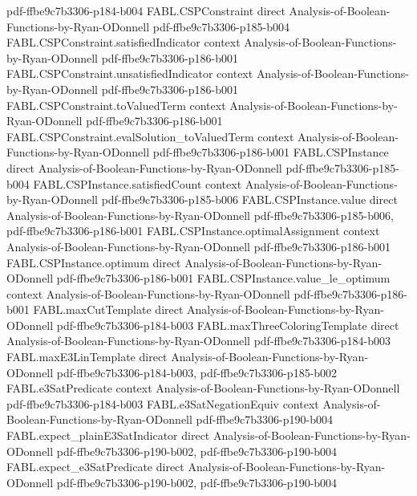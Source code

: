 \begin{theorem}
  {pdf-ffbe9c7b3306-p184-b004}
\proofstep
  {FABL.CSPConstraint}
  {direct}
  {Analysis-of-Boolean-Functions-by-Ryan-ODonnell}
  {pdf-ffbe9c7b3306-p185-b004}
\proofstep
  {FABL.CSPConstraint.satisfiedIndicator}
  {context}
  {Analysis-of-Boolean-Functions-by-Ryan-ODonnell}
  {pdf-ffbe9c7b3306-p186-b001}
\proofstep
  {FABL.CSPConstraint.unsatisfiedIndicator}
  {context}
  {Analysis-of-Boolean-Functions-by-Ryan-ODonnell}
  {pdf-ffbe9c7b3306-p186-b001}
\proofstep
  {FABL.CSPConstraint.toValuedTerm}
  {context}
  {Analysis-of-Boolean-Functions-by-Ryan-ODonnell}
  {pdf-ffbe9c7b3306-p186-b001}
\proofstep
  {FABL.CSPConstraint.evalSolution_toValuedTerm}
  {context}
  {Analysis-of-Boolean-Functions-by-Ryan-ODonnell}
  {pdf-ffbe9c7b3306-p186-b001}
\proofstep
  {FABL.CSPInstance}
  {direct}
  {Analysis-of-Boolean-Functions-by-Ryan-ODonnell}
  {pdf-ffbe9c7b3306-p185-b004}
\proofstep
  {FABL.CSPInstance.satisfiedCount}
  {context}
  {Analysis-of-Boolean-Functions-by-Ryan-ODonnell}
  {pdf-ffbe9c7b3306-p185-b006}
\proofstep
  {FABL.CSPInstance.value}
  {direct}
  {Analysis-of-Boolean-Functions-by-Ryan-ODonnell}
  {pdf-ffbe9c7b3306-p185-b006,
    pdf-ffbe9c7b3306-p186-b001}
\proofstep
  {FABL.CSPInstance.optimalAssignment}
  {context}
  {Analysis-of-Boolean-Functions-by-Ryan-ODonnell}
  {pdf-ffbe9c7b3306-p186-b001}
\proofstep
  {FABL.CSPInstance.optimum}
  {direct}
  {Analysis-of-Boolean-Functions-by-Ryan-ODonnell}
  {pdf-ffbe9c7b3306-p186-b001}
\proofstep
  {FABL.CSPInstance.value_le_optimum}
  {context}
  {Analysis-of-Boolean-Functions-by-Ryan-ODonnell}
  {pdf-ffbe9c7b3306-p186-b001}
\proofstep
  {FABL.maxCutTemplate}
  {direct}
  {Analysis-of-Boolean-Functions-by-Ryan-ODonnell}
  {pdf-ffbe9c7b3306-p184-b003}
\proofstep
  {FABL.maxThreeColoringTemplate}
  {direct}
  {Analysis-of-Boolean-Functions-by-Ryan-ODonnell}
  {pdf-ffbe9c7b3306-p184-b003}
\proofstep
  {FABL.maxE3LinTemplate}
  {direct}
  {Analysis-of-Boolean-Functions-by-Ryan-ODonnell}
  {pdf-ffbe9c7b3306-p184-b003,
    pdf-ffbe9c7b3306-p185-b002}
\proofstep
  {FABL.e3SatPredicate}
  {context}
  {Analysis-of-Boolean-Functions-by-Ryan-ODonnell}
  {pdf-ffbe9c7b3306-p184-b003}
\proofstep
  {FABL.e3SatNegationEquiv}
  {context}
  {Analysis-of-Boolean-Functions-by-Ryan-ODonnell}
  {pdf-ffbe9c7b3306-p190-b004}
\proofstep
  {FABL.expect_plainE3SatIndicator}
  {direct}
  {Analysis-of-Boolean-Functions-by-Ryan-ODonnell}
  {pdf-ffbe9c7b3306-p190-b002,
    pdf-ffbe9c7b3306-p190-b004}
\proofstep
  {FABL.expect_e3SatPredicate}
  {direct}
  {Analysis-of-Boolean-Functions-by-Ryan-ODonnell}
  {pdf-ffbe9c7b3306-p190-b002,
    pdf-ffbe9c7b3306-p190-b004}

\end{theorem}
